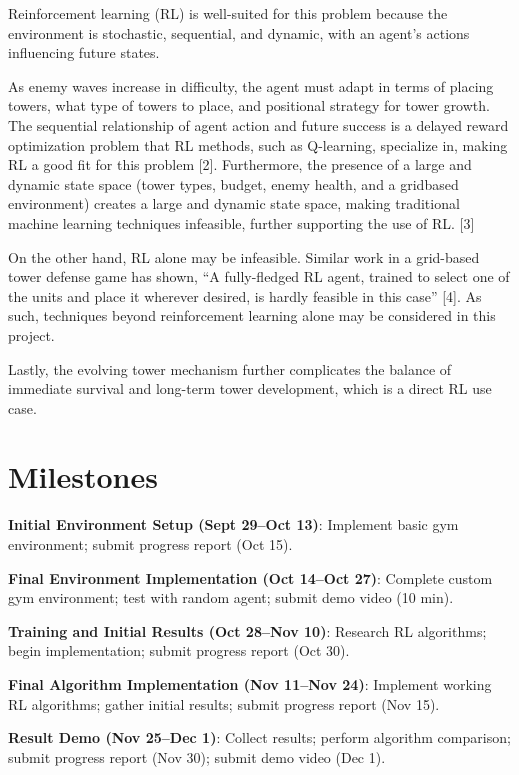 \documentclass[12pt]{article}
\newcounter{ques}
\begin{document}
Reinforcement learning (RL) is well-suited for this problem because the environment is stochastic, sequential, and dynamic, with an agent's actions influencing future states. \par 

As enemy waves increase in difficulty, the agent must adapt in terms of placing towers, what type of towers to place, and positional strategy for tower growth. The sequential relationship of agent action and future success is a delayed reward optimization problem that RL methods, such as Q-learning, specialize in, making RL a good fit for this problem [2]. Furthermore, the presence of a large and dynamic state space (tower types, budget, enemy health, and a gridbased environment) creates a large and dynamic state space, making traditional machine learning techniques infeasible, further supporting the use of RL. [3] \par

On the other hand, RL alone may be infeasible. Similar work in a grid-based tower defense game has shown, “A fully-fledged RL agent, trained to select one of the units and place it wherever desired, is hardly feasible in this case” [4]. As such, techniques beyond reinforcement learning alone may be considered in this project. \par

Lastly, the evolving tower mechanism further complicates the balance of immediate survival and long-term tower development, which is a direct RL use case. \par


\section*{Milestones}

\textbf{Initial Environment Setup (Sept 29--Oct 13)}: Implement basic gym environment; submit progress report (Oct 15). 

\textbf{Final Environment Implementation (Oct 14--Oct 27)}: Complete custom gym environment; test with random agent; submit demo video (10 min). 

\textbf{Training and Initial Results (Oct 28--Nov 10)}: Research RL algorithms; begin implementation; submit progress report (Oct 30). 

\textbf{Final Algorithm Implementation (Nov 11--Nov 24)}: Implement working RL algorithms; gather initial results; submit progress report (Nov 15). 

\textbf{Result Demo (Nov 25--Dec 1)}: Collect results; perform algorithm comparison; submit progress report (Nov 30); submit demo video (Dec 1). 
\end{document}
